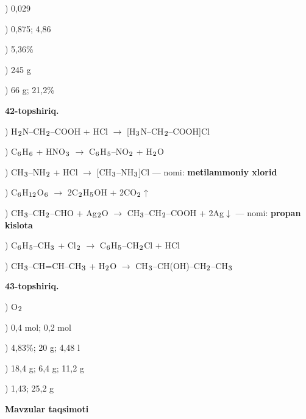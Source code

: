 \documentclass[11pt,a4paper]{article}
\renewcommand{\textsubscript}[1]{\ensuremath{_{\text{\fontsize{8}{8}\selectfont #1}}}}
\begin{document}
) 0,029\par
{}) 0,875; 4,86\par
{}) 5,36\%\par
{}) 245 g\par
{}) 66 g; 21,2\%\par
\noindent\textbf{42-topshiriq.}\par
{}) H\textsubscript{2}N--CH\textsubscript{2}--COOH + HCl $\to$ [H\textsubscript{3}N--CH\textsubscript{2}--COOH]Cl\par
{}) C\textsubscript{6}H\textsubscript{6} + HNO\textsubscript{3} $\to$ C\textsubscript{6}H\textsubscript{5}--NO\textsubscript{2} + H\textsubscript{2}O\par
{}) CH\textsubscript{3}--NH\textsubscript{2} + HCl $\to$ [CH\textsubscript{3}--NH\textsubscript{3}]Cl --- nomi: \textbf{metilammoniy xlorid}\par
{}) C\textsubscript{6}H\textsubscript{12}O\textsubscript{6} $\to$ 2C\textsubscript{2}H\textsubscript{5}OH + 2CO\textsubscript{2}$\uparrow$\par
{}) CH\textsubscript{3}--CH\textsubscript{2}--CHO + Ag\textsubscript{2}O $\to$ CH\textsubscript{3}--CH\textsubscript{2}--COOH + 2Ag$\downarrow$ --- nomi: \textbf{propan kislota}\par
{}) C\textsubscript{6}H\textsubscript{5}--CH\textsubscript{3} + Cl\textsubscript{2} $\to$ C\textsubscript{6}H\textsubscript{5}--CH\textsubscript{2}Cl + HCl\par
{}) CH\textsubscript{3}--CH=CH--CH\textsubscript{3} + H\textsubscript{2}O $\to$ CH\textsubscript{3}--CH(OH)--CH\textsubscript{2}--CH\textsubscript{3}\par
\noindent\textbf{43-topshiriq.}\par
{}) O\textsubscript{2}\par
{}) 0,4 mol; 0,2 mol\par
{}) 4,83\%; 20 g; 4,48 l\par
{}) 18,4 g; 6,4 g; 11,2 g\par
{}) 1,43; 25,2 g\par
\par\bigskip\noindent\textbf{Mavzular taqsimoti}\par\smallskip
\end{document}
